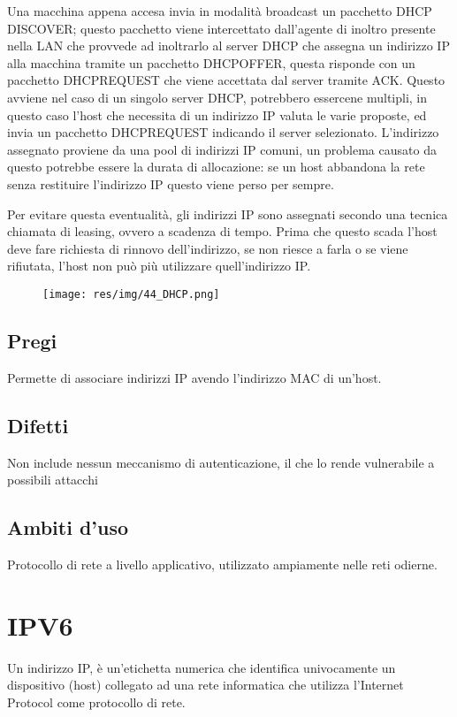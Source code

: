 Una macchina appena accesa invia in modalità broadcast un pacchetto DHCP DISCOVER; questo pacchetto viene intercettato dall'agente di inoltro presente nella LAN che provvede ad inoltrarlo al server DHCP che assegna un indirizzo IP alla macchina tramite un pacchetto DHCPOFFER, questa risponde con un pacchetto DHCPREQUEST che viene accettata dal server tramite ACK.
Questo avviene nel caso di un singolo server DHCP, potrebbero essercene multipli, in questo caso l'host che necessita di un indirizzo IP valuta le varie proposte, ed invia un pacchetto DHCPREQUEST indicando il server selezionato.
L'indirizzo assegnato proviene da una pool di indirizzi IP comuni, un problema causato da questo potrebbe essere la durata di allocazione: se un host abbandona la rete senza restituire l'indirizzo IP questo viene perso per sempre.

Per evitare questa eventualità, gli indirizzi IP sono assegnati secondo una tecnica chiamata di leasing, ovvero a scadenza di tempo. Prima che questo scada l'host deve fare richiesta di rinnovo dell'indirizzo, se non riesce a farla o se viene rifiutata, l'host non può più utilizzare quell'indirizzo IP.

\begin{figure}[H]
\centering
\texttt{[image: res/img/44\_DHCP.png]}
\end{figure}

\subsection{Pregi}
Permette di associare indirizzi IP avendo l'indirizzo MAC di un'host.

\subsection{Difetti}
Non include nessun meccanismo di autenticazione, il che lo rende vulnerabile a possibili attacchi

\subsection{Ambiti d'uso}
Protocollo di rete a livello applicativo, utilizzato ampiamente nelle reti odierne.

\section{IPV6}

Un indirizzo IP, è un'etichetta numerica che identifica univocamente un dispositivo (host) collegato ad una rete informatica che utilizza l'Internet Protocol come protocollo di rete.

